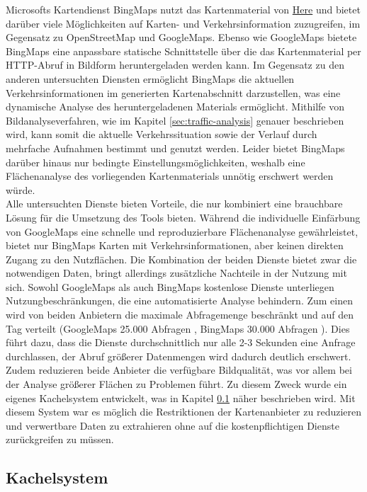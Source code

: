 Microsofts Kartendienst BingMaps nutzt das Kartenmaterial von \href{https://here.com/}{Here} und bietet darüber viele Möglichkeiten auf Karten- und Verkehrsinformation zuzugreifen, im Gegensatz zu OpenStreetMap und GoogleMaps. Ebenso wie GoogleMaps bietete BingMaps eine anpassbare statische Schnittstelle \cite{bingstaticmap} über die das Kartenmaterial per HTTP-Abruf in Bildform heruntergeladen werden kann. Im Gegensatz zu den anderen untersuchten Diensten ermöglicht BingMaps die aktuellen Verkehrsinformationen im generierten Kartenabschnitt darzustellen, was eine dynamische Analyse des heruntergeladenen Materials ermöglicht. Mithilfe von Bildanalyseverfahren, wie im Kapitel \ref{sec:traffic-analysis} genauer beschrieben wird, kann somit die aktuelle Verkehrssituation sowie der Verlauf durch mehrfache Aufnahmen bestimmt und genutzt werden. Leider bietet BingMaps darüber hinaus nur bedingte Einstellungsmöglichkeiten, weshalb eine Flächenanalyse des vorliegenden Kartenmaterials unnötig erschwert werden würde.\\

Alle untersuchten Dienste bieten Vorteile, die nur kombiniert eine brauchbare Lösung für die Umsetzung des Tools bieten. Während die individuelle Einfärbung von GoogleMaps eine schnelle und reproduzierbare Flächenanalyse gewährleistet, bietet nur BingMaps Karten mit Verkehrsinformationen, aber keinen direkten Zugang zu den Nutzflächen. Die Kombination der beiden Dienste bietet zwar die notwendigen Daten, bringt allerdings zusätzliche Nachteile in der Nutzung mit sich. Sowohl GoogleMaps als auch BingMaps kostenlose Dienste unterliegen Nutzungbeschränkungen, die eine automatisierte Analyse behindern. Zum einen wird von beiden Anbietern die maximale Abfragemenge beschränkt und auf den Tag verteilt (GoogleMaps 25.000 Abfragen \cite{googleusagelimits}, BingMaps 30.000 Abfragen \cite{bingusagelimits}). Dies führt dazu, dass die Dienste durchschnittlich nur alle 2-3 Sekunden eine Anfrage durchlassen, der Abruf größerer Datenmengen wird dadurch deutlich erschwert. Zudem reduzieren beide Anbieter die verfügbare Bildqualität, was vor allem bei der Analyse größerer Flächen zu Problemen führt. Zu diesem Zweck wurde ein eigenes Kachelsystem entwickelt, was in Kapitel \ref{sec:kachelsystem} näher beschrieben wird. Mit diesem System war es möglich die Restriktionen der Kartenanbieter zu reduzieren und verwertbare Daten zu extrahieren ohne auf die kostenpflichtigen Dienste zurückgreifen zu müssen.\\

\subsection{Kachelsystem}
\label{sec:kachelsystem}

